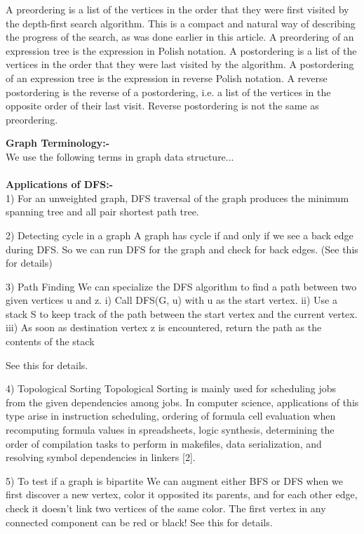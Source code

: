 \documentclass[11pt]{article}            %
\begin{document}
A preordering is a list of the vertices in the order that they were first visited by the depth-first search algorithm. This is a compact and natural way of describing the progress of the search, as was done earlier in this article. A preordering of an expression tree is the expression in Polish notation.
A postordering is a list of the vertices in the order that they were last visited by the algorithm. A postordering of an expression tree is the expression in reverse Polish notation.
A reverse postordering is the reverse of a postordering, i.e. a list of the vertices in the opposite order of their last visit. Reverse postordering is not the same as preordering.




\textbf{Graph Terminology:- }\\
We use the following terms in graph data structure...\\ \\

\textbf{Applications of DFS:-}\\
1) For an unweighted graph, DFS traversal of the graph produces the minimum spanning tree and all pair shortest path tree.



 

2) Detecting cycle in a graph 
A graph has cycle if and only if we see a back edge during DFS. So we can run DFS for the graph and check for back edges. (See this for details)

3) Path Finding
We can specialize the DFS algorithm to find a path between two given vertices u and z.
i) Call DFS(G, u) with u as the start vertex.
ii) Use a stack S to keep track of the path between the start vertex and the current vertex.
iii) As soon as destination vertex z is encountered, return the path as the
contents of the stack

See this for details.

4) Topological Sorting
Topological Sorting is mainly used for scheduling jobs from the given dependencies among jobs. In computer science, applications of this type arise in instruction scheduling, ordering of formula cell evaluation when recomputing formula values in spreadsheets, logic synthesis, determining the order of compilation tasks to perform in makefiles, data serialization, and resolving symbol dependencies in linkers [2].



 

5) To test if a graph is bipartite
We can augment either BFS or DFS when we first discover a new vertex, color it opposited its parents, and for each other edge, check it doesn’t link two vertices of the same color. The first vertex in any connected component can be red or black! See this for details.
\end{document}
